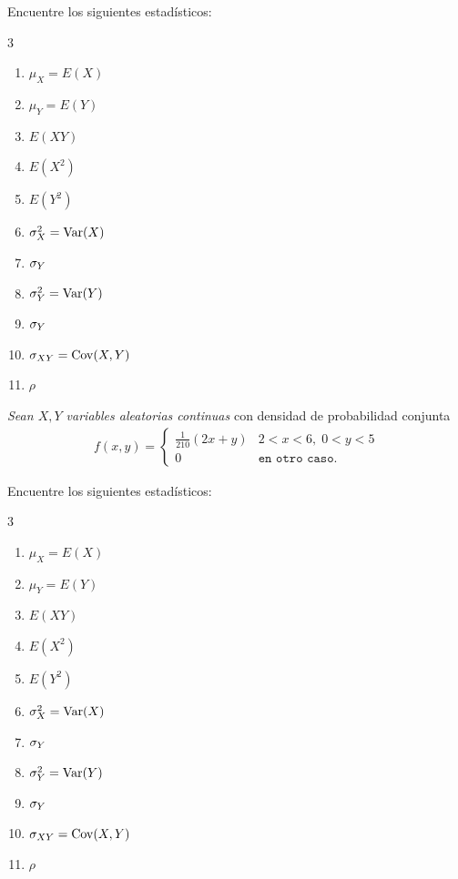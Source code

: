 Encuentre los siguientes estadísticos:
\begin{multicols}{3}
 \begin{enumerate}
 \item $\mu_X = E(X)$ %
 \item $\mu_Y = E(Y)$ %
 \item $ E(XY)$ %
 \item $E(X^2)$ %
 \item $E(Y^2)$ %
 \item $\sigma^2_X = \operatorname{Var}(X)$ %
 \item $\sigma_{Y}$
 \item $\sigma^2_Y = \operatorname{Var}(Y)$ %
 \item $\sigma_{Y}$
 \item $\sigma_{XY} =\operatorname{Cov}(X,Y)$ %
 \item $\rho$
\end{enumerate}
\end{multicols}






 \begin{ejemplo}
  \label{exmp:2.9.6}
  \emph{Sean $X,Y$ variables aleatorias continuas} con densidad de probabilidad conjunta
  \begin{align}f(x,y)=
   \begin{cases}
    \frac{1}{210}(2x+y) & 2 < x < 6,\; 0<y<5 \\
    0 & \texttt{en otro caso}.
   \end{cases}
  \end{align}
 \end{ejemplo}

 

Encuentre los siguientes estadísticos:
\begin{multicols}{3}
 \begin{enumerate}
 \item $\mu_X = E(X)$ %
 \item $\mu_Y = E(Y)$ %
 \item $ E(XY)$ %
 \item $E(X^2)$ %
 \item $E(Y^2)$ %
 \item $\sigma^2_X = \operatorname{Var}(X)$ %
 \item $\sigma_{Y}$
 \item $\sigma^2_Y = \operatorname{Var}(Y)$ %
 \item $\sigma_{Y}$
 \item $\sigma_{XY} =\operatorname{Cov}(X,Y)$ %
 \item $\rho$
\end{enumerate}
\end{multicols}




